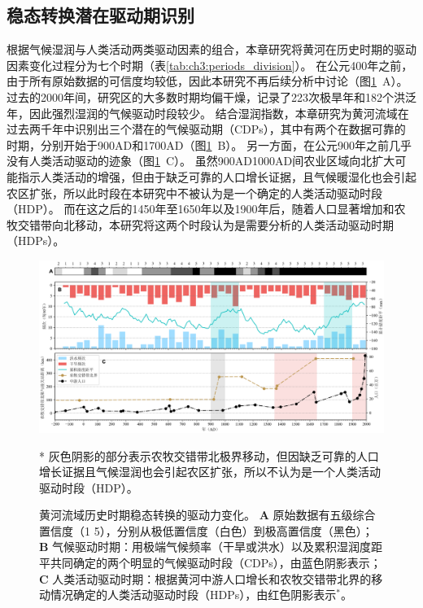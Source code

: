 
\subsection{稳态转换潜在驱动期识别}

根据气候湿润与人类活动两类驱动因素的组合，本章研究将黄河在历史时期的驱动因素变化过程分为七个时期（表\ref{tab:ch3:periods_division}）。
在公元400年之前，由于所有原始数据的可信度均较低，因此本研究不再后续分析中讨论（图\ref{fig:ch3:drivers}~A）。
过去的2000年间，研究区的大多数时期均偏干燥，记录了223次极旱年和182个洪泛年，因此强烈湿润的气候驱动时段较少。
结合湿润指数，本章研究为黄河流域在过去两千年中识别出三个潜在的气候驱动期（CDPs），其中有两个在数据可靠的时期，分别开始于900AD和1700AD（图\ref{fig:ch3:drivers}~B）。
另一方面，在公元900年之前几乎没有人类活动驱动的迹象（图\ref{fig:ch3:drivers}~C）。
虽然900AD\textendash{}1000AD间农业区域向北扩大可能指示人类活动的增强，但由于缺乏可靠的人口增长证据，且气候暖湿化也会引起农区扩张，所以此时段在本研究中不被认为是一个确定的人类活动驱动时段（HDP）。
而在这之后的1450年至1650年以及1900年后，随着人口显著增加和农牧交错带向北移动，本研究将这两个时段认为是需要分析的人类活动驱动时期（HDPs）。



\begin{figure}[!ht]
    \includegraphics[width=\textwidth]{img/ch3/ch3_drivers.png}
    \caption[黄河流域历史时期稳态转换的驱动力变化]{黄河流域历史时期稳态转换的驱动力变化。
    \textbf{A} 原始数据有五级综合置信度（1 \textendash{} 5），分别从极低置信度（白色）到极高置信度（黑色）；
    \textbf{B} 气候驱动时期：用极端气候频率（干旱或洪水）以及累积湿润度距平共同确定的两个明显的气候驱动时段（CDPs），由蓝色阴影表示；
    \textbf{C} 人类活动驱动时期：根据黄河中游人口增长和农牧交错带北界的移动情况确定的人类活动驱动时段（HDPs），由红色阴影表示$^*$。}
    \footnotesize
    * 灰色阴影的部分表示农牧交错带北极界移动，但因缺乏可靠的人口增长证据且气候湿润也会引起农区扩张，所以不认为是一个人类活动驱动时段（HDP）。\label{fig:ch3:drivers}
\end{figure}

